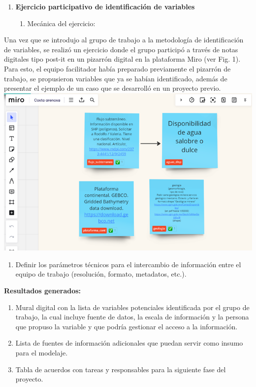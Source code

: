 \documentclass[
  letterpaper,
  DIV=11,
  numbers=noendperiod]{scrreprt}
\providecommand{\tightlist}{%
  \setlength{\itemsep}{0pt}\setlength{\parskip}{0pt}}\usepackage{longtable,booktabs,array}
\begin{document}
\begin{enumerate}
\def\labelenumi{\arabic{enumi}.}
\setcounter{enumi}{5}
\item
  \textbf{Ejercicio participativo de identificación de variables}

  \begin{enumerate}
  \def\labelenumii{\alph{enumii}.}
  \tightlist
  \item
    Mecánica del ejercicio:
  \end{enumerate}
\end{enumerate}

Una vez que se introdujo al grupo de trabajo a la metodología de
identificación de variables, se realizó un ejercicio donde el grupo
participó a través de notas digitales tipo post-it en un pizarrón
digital en la plataforma Miro (ver Fig. 1). Para esto, el equipo
facilitador había preparado previamente el pizarrón de trabajo, se
propusieron variables que ya se habían identificado, además de presentar
el ejemplo de un caso que se desarrolló en un proyecto previo.
\includegraphics{capitulos/images/Taller_figura_1.png}

\begin{enumerate}
\def\labelenumi{\arabic{enumi}.}
\setcounter{enumi}{3}
\tightlist
\item
  Definir los parámetros técnicos para el intercambio de información
  entre el equipo de trabajo (resolución, formato, metadatos, etc.).
\end{enumerate}

\textbf{Resultados generados:}

\begin{enumerate}
\def\labelenumi{\arabic{enumi}.}
\tightlist
\item
  Mural digital con la lista de variables potenciales identificada por
  el grupo de trabajo, la cual incluye fuente de datos, la escala de
  información y la persona que propuso la variable y que podría
  gestionar el acceso a la información.
\item
  Lista de fuentes de información adicionales que puedan servir como
  insumo para el modelaje.
\item
  Tabla de acuerdos con tareas y responsables para la siguiente fase del
  proyecto.
\end{enumerate}
\end{document}
